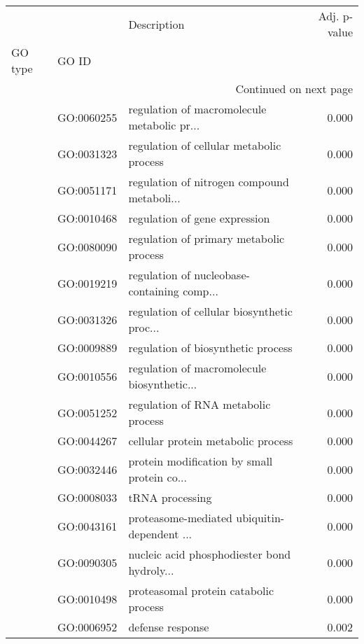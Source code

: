 \begin{longtable}{lllr}
\toprule
   &            &                                  Description &  Adj. p-value \\
GO type & GO ID &                                              &               \\
\midrule
\endhead
\midrule
\multicolumn{4}{r}{{Continued on next page}} \\
\midrule
\endfoot

\bottomrule
\endlastfoot
\multirow{65}{*}{BP} & GO:0060255 &  regulation of macromolecule metabolic pr... &         0.000 \\
   & GO:0031323 &     regulation of cellular metabolic process &         0.000 \\
   & GO:0051171 &  regulation of nitrogen compound metaboli... &         0.000 \\
   & GO:0010468 &                regulation of gene expression &         0.000 \\
   & GO:0080090 &      regulation of primary metabolic process &         0.000 \\
   & GO:0019219 &  regulation of nucleobase-containing comp... &         0.000 \\
   & GO:0031326 &  regulation of cellular biosynthetic proc... &         0.000 \\
   & GO:0009889 &           regulation of biosynthetic process &         0.000 \\
   & GO:0010556 &  regulation of macromolecule biosynthetic... &         0.000 \\
   & GO:0051252 &          regulation of RNA metabolic process &         0.000 \\
   & GO:0044267 &           cellular protein metabolic process &         0.000 \\
   & GO:0032446 &  protein modification by small protein co... &         0.000 \\
   & GO:0008033 &                              tRNA processing &         0.000 \\
   & GO:0043161 &  proteasome-mediated ubiquitin-dependent ... &         0.000 \\
   & GO:0090305 &  nucleic acid phosphodiester bond hydroly... &         0.000 \\
   & GO:0010498 &        proteasomal protein catabolic process &         0.000 \\
   & GO:0006952 &                             defense response &         0.002 \\

\end{longtable}
